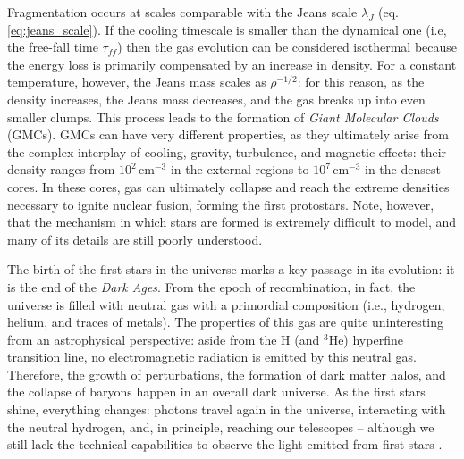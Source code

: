  Fragmentation occurs at scales comparable with the Jeans scale $\lambda_J$ (eq. \ref{eq:jeans_scale}). If the cooling timescale is smaller than the dynamical one (i.e, the free-fall time $\tau_{ff}$) then the gas evolution can be considered isothermal because the energy loss is primarily compensated by an increase in density. For a constant temperature, however, the Jeans mass scales as $\rho^{-1/2}$: for this reason, as the density increases, the Jeans mass decreases, and the gas breaks up into even smaller clumps. This process leads to the formation of \textit{Giant Molecular Clouds} (GMCs). GMCs can have very different properties, as they ultimately arise from the complex interplay of cooling, gravity, turbulence, and magnetic effects: their density ranges from $10^2\,\mathrm{cm}^{-3}$ in the external regions to $10^7\,\mathrm{cm}^{-3}$ in the densest cores. In these cores, gas can ultimately collapse and reach the extreme densities necessary to ignite nuclear fusion, forming the first protostars. Note, however, that the mechanism in which stars are formed is extremely difficult to model, and many of its details are still poorly understood.
 
 
 The birth of the first stars in the universe marks a key passage in its evolution: it is the end of the \textit{Dark Ages}. From the epoch of recombination, in fact, the universe is filled with neutral gas with a primordial composition (i.e., hydrogen, helium, and traces of metals). The properties of this gas are quite uninteresting from an astrophysical perspective: aside from the H (and $^3$He) hyperfine transition line, no electromagnetic radiation is emitted by this neutral gas. Therefore, the growth of perturbations, the formation of dark matter halos, and the collapse of baryons happen in an overall dark universe. As the first stars shine, everything changes: photons travel again in the universe, interacting with the neutral hydrogen, and, in principle, reaching our telescopes -- although we still lack the technical capabilities to observe the light emitted from first stars \citep{rydberg2013detection}. 
 
